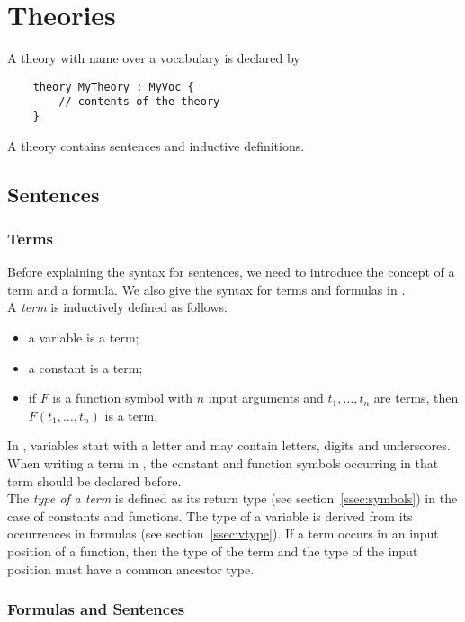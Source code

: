 \section{Theories}
A theory with name  over a vocabulary  is declared by
\begin{lstlisting}
	theory MyTheory : MyVoc {
		// contents of the theory
	}
\end{lstlisting}
A theory contains sentences and inductive definitions.

\subsection{Sentences}


\subsubsection{Terms}

Before explaining the syntax for sentences, we need to introduce the concept of a term and a formula. We also give the syntax for terms and formulas in \idp.\\


A \emph{term} is inductively defined as follows:
\begin{itemize}
	\item a variable is a term;
	\item a constant is a term;
	\item if $F$ is a function symbol with $n$ input arguments and $t_1, \ldots, t_n$ are terms, then $F(t_1,\ldots,t_n)$ is a term. 
\end{itemize}
In \idp, variables start with a letter and may contain letters, digits and underscores. When writing a term in \idp, the constant and function symbols occurring in that term should be declared before. \\
The \emph{type of a term} is defined as its return type (see section~\ref{ssec:symbols}) in the case of constants and functions. The type of a variable is derived from its occurrences in formulas (see section~\ref{ssec:vtype}). If a term occurs in an input position of a function, then the type of the term and the type of the input position must have a common ancestor type. 

\subsubsection{Formulas and Sentences}

